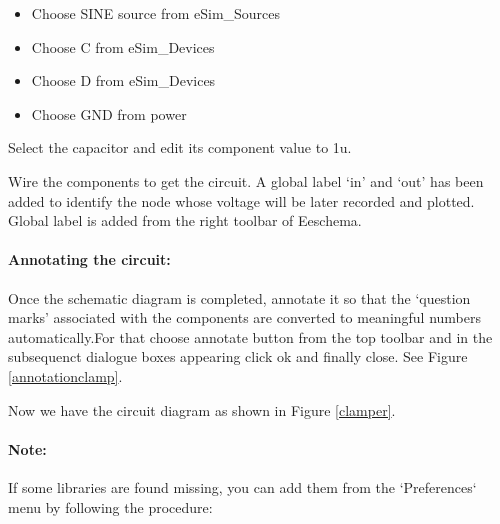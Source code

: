 
\begin{itemize}
\item
Choose SINE source from eSim\_Sources
\item
Choose C from eSim\_Devices
\item
Choose D from eSim\_Devices
\item
Choose GND from power
\end{itemize}

Select the capacitor and edit its component value to 1u.%


Wire the components to get the circuit. A global label `in'  and `out' has been added to identify the node whose voltage will be later recorded and plotted. Global label is added from the right toolbar of Eeschema.

\paragraph{Annotating the circuit:} Once the schematic diagram is completed, annotate it so that the `question marks' associated with the components are converted to meaningful numbers automatically.For that choose annotate button from the top toolbar and in the subsequenct dialogue boxes appearing click ok and finally close. See Figure \ref{annotationclamp}.




Now we have the circuit diagram as shown in Figure \ref{clamper}.


\paragraph{Note:} If some libraries are found missing, you can add them from the `Preferences` menu by following the procedure: 

